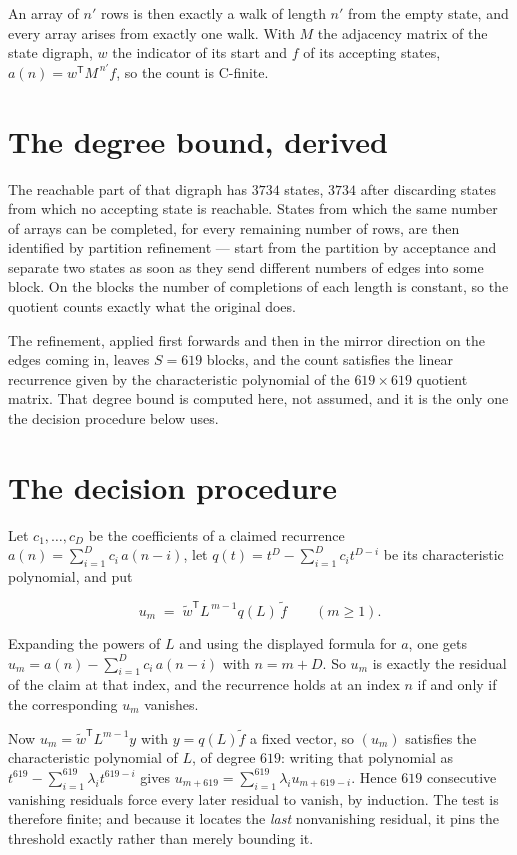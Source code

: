 \documentclass[11pt]{article}
\theoremstyle{definition}
\begin{document}
An array of $n'$ rows is then exactly a walk of length $n'$ from the empty state, and every array arises from exactly one walk. With $M$ the adjacency matrix of the state digraph, $w$ the indicator of its start and $f$ of its accepting states, $a(n) = w^{\mathsf T}M^{\,n'}f$, so the count is C-finite.

\section{The degree bound, derived}

The reachable part of that digraph has $3734$ states, $3734$ after discarding states from which no accepting state is reachable. States from which the same number of arrays can be completed, for every remaining number of rows, are then identified by partition refinement --- start from the partition by acceptance and separate two states as soon as they send different numbers of edges into some block. On the blocks the number of completions of each length is constant, so the quotient counts exactly what the original does.

The refinement, applied first forwards and then in the mirror direction on the edges coming in, leaves $S = 619$ blocks, and the count satisfies the linear recurrence given by the characteristic polynomial of the $619 \times 619$ quotient matrix. That degree bound is computed here, not assumed, and it is the only one the decision procedure below uses.

\section{The decision procedure}

Let $c_1,\dots,c_D$ be the coefficients of a claimed recurrence $a(n) = \sum_{i=1}^{D} c_i\,a(n-i)$, let $q(t) = t^{D} - \sum_{i=1}^{D} c_i t^{D-i}$ be its characteristic polynomial, and put

\[u_m \;=\; \tilde w^{\mathsf T} L^{\,m-1} q(L)\,\tilde f \qquad (m \ge 1).\]

Expanding the powers of $L$ and using the displayed formula for $a$, one gets $u_m = a(n) - \sum_{i=1}^{D} c_i\,a(n-i)$ with $n = m + D$. So $u_m$ is exactly the residual of the claim at that index, and the recurrence holds at an index $n$ if and only if the corresponding $u_m$ vanishes.

Now $u_m = \tilde w^{\mathsf T} L^{m-1} y$ with $y = q(L)\tilde f$ a fixed vector, so $(u_m)$ satisfies the characteristic polynomial of $L$, of degree $619$: writing that polynomial as $t^{619} - \sum_{i=1}^{619} \lambda_i t^{619-i}$ gives $u_{m+619} = \sum_{i=1}^{619} \lambda_i u_{m+619-i}$. Hence $619$ consecutive vanishing residuals force every later residual to vanish, by induction. The test is therefore finite; and because it locates the {\itshape last} nonvanishing residual, it pins the threshold exactly rather than merely bounding it.
\end{document}
